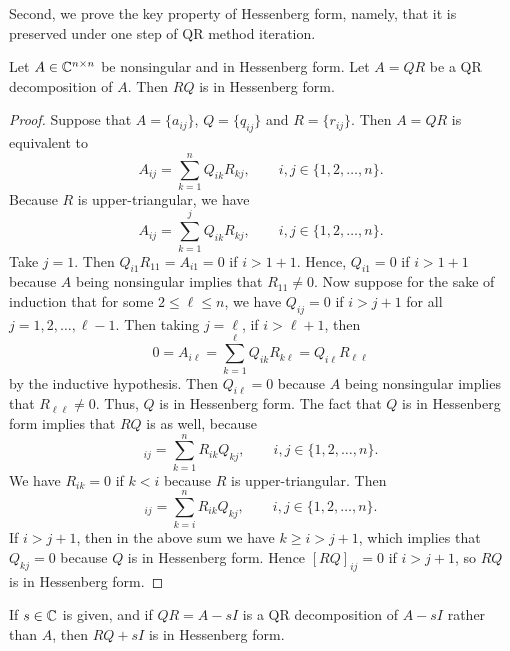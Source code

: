 \documentclass{article}
\begin{document}
Second, we prove the key property of Hessenberg form, namely, that it is preserved under one step of QR method iteration.
\begin{theorem}
	Let $A \in \mathbb{C}^{n\times n}$ be nonsingular and in Hessenberg form. Let $A = QR$ be a QR decomposition of $A$. Then $RQ$ is in Hessenberg form.
\end{theorem}
\begin{proof}
	Suppose that $A = \{a_{ij}\}$, $Q = \{q_{ij}\}$ and $R = \{r_{ij}\}$. Then $A = QR$ is equivalent to
	\begin{equation*}
		A_{ij} = \sum_{k=1}^n Q_{ik}R_{kj}, \qquad i,j \in \{1,2,\dots, n\}.
	\end{equation*}
	Because $R$ is upper-triangular, we have
	\begin{equation*}
		A_{ij} = \sum_{k=1}^j Q_{ik}R_{kj}, \qquad i,j \in \{1,2,\dots, n\}.
	\end{equation*}
	Take $j = 1$. Then $Q_{i1}R_{11} = A_{i1} = 0$ if $i > 1+1$. Hence, $Q_{i1} = 0$ if $i > 1+1$ because $A$ being nonsingular implies that $R_{11}\ne 0$. Now suppose for the sake of induction that for some $2\le \ell \le n$, we have $Q_{ij} = 0$ if $i > j+1$ for all $j = 1,2,\dots, \ell-1$. Then taking $j = \ell$, if $i > \ell + 1$, then
	\begin{equation*}
		0 = A_{i\ell} = \sum_{k=1}^\ell Q_{ik}R_{k\ell} = Q_{i\ell}R_{\ell\ell}
	\end{equation*}
	by the inductive hypothesis. Then $Q_{i\ell} = 0$ because $A$ being nonsingular implies that $R_{\ell\ell} \ne 0$. Thus, $Q$ is in Hessenberg form. The fact that $Q$ is in Hessenberg form implies that $RQ$ is as well, because
	\begin{equation*}
		[RQ]_{ij} = \sum_{k=1}^n R_{ik}Q_{kj}, \qquad i,j \in \{1,2,\dots, n\}.
	\end{equation*}
	We have $R_{ik} = 0$ if $k < i$ because $R$ is upper-triangular. Then
	\begin{equation*}
		[RQ]_{ij} = \sum_{k=i}^n R_{ik}Q_{kj}, \qquad i,j \in \{1,2,\dots, n\}.
	\end{equation*}
	If $i > j + 1$, then in the above sum we have $k \ge i > j + 1$, which implies that $Q_{kj} = 0$ because $Q$ is in Hessenberg form. Hence $[RQ]_{ij} = 0$ if $i > j +1$, so $RQ$ is in Hessenberg form.
\end{proof}
\begin{corollary}
	If $s \in \mathbb{C}$ is given, and if $QR = A-s I$ is a QR decomposition of $A-s I$ rather than $A$, then $RQ + sI$ is in Hessenberg form.
\end{corollary}
\end{document}
